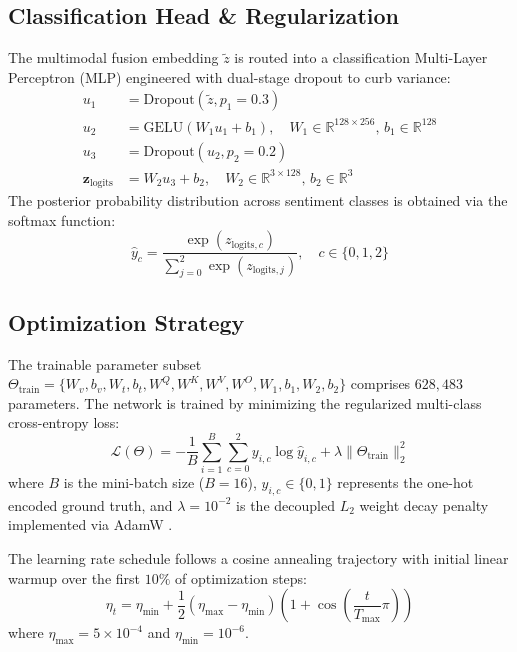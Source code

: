 \documentclass[10pt,journal,compsoc]{IEEEtran}
\begin{document}
\subsection{Classification Head \& Regularization}
The multimodal fusion embedding $\tilde{z}$ is routed into a classification Multi-Layer Perceptron (MLP) engineered with dual-stage dropout to curb variance:
\begin{align}
    u_1 &= \text{Dropout}(\tilde{z}, p_1 = 0.3) \\
    u_2 &= \text{GELU}(W_1 u_1 + b_1), \quad W_1 \in \mathbb{R}^{128 \times 256}, \, b_1 \in \mathbb{R}^{128} \\
    u_3 &= \text{Dropout}(u_2, p_2 = 0.2) \\
    \mathbf{z}_{\text{logits}} &= W_2 u_3 + b_2, \quad W_2 \in \mathbb{R}^{3 \times 128}, \, b_2 \in \mathbb{R}^{3}
\end{align}
The posterior probability distribution across sentiment classes is obtained via the softmax function:
\begin{equation}
    \hat{y}_c = \frac{\exp(z_{\text{logits}, c})}{\sum_{j=0}^{2} \exp(z_{\text{logits}, j})}, \quad c \in \{0, 1, 2\}
\end{equation}

\subsection{Optimization Strategy}
The trainable parameter subset $\Theta_{\text{train}} = \{W_v, b_v, W_t, b_t, W^Q, W^K, W^V, W^O, W_1, b_1, W_2, b_2\}$ comprises $628,483$ parameters. The network is trained by minimizing the regularized multi-class cross-entropy loss:
\begin{equation}
    \mathcal{L}(\Theta) = -\frac{1}{B} \sum_{i=1}^{B} \sum_{c=0}^{2} y_{i, c} \log \hat{y}_{i, c} + \lambda \|\Theta_{\text{train}}\|_2^2
\end{equation}
where $B$ is the mini-batch size ($B=16$), $y_{i, c} \in \{0, 1\}$ represents the one-hot encoded ground truth, and $\lambda = 10^{-2}$ is the decoupled $L_2$ weight decay penalty implemented via AdamW \cite{loshchilov2018decoupled}. 

The learning rate schedule follows a cosine annealing trajectory with initial linear warmup over the first $10\%$ of optimization steps:
\begin{equation}
    \eta_t = \eta_{\min} + \frac{1}{2}(\eta_{\max} - \eta_{\min})\left(1 + \cos\left(\frac{t}{T_{\max}}\pi\right)\right)
\end{equation}
where $\eta_{\max} = 5 \times 10^{-4}$ and $\eta_{\min} = 10^{-6}$.
\end{document}
